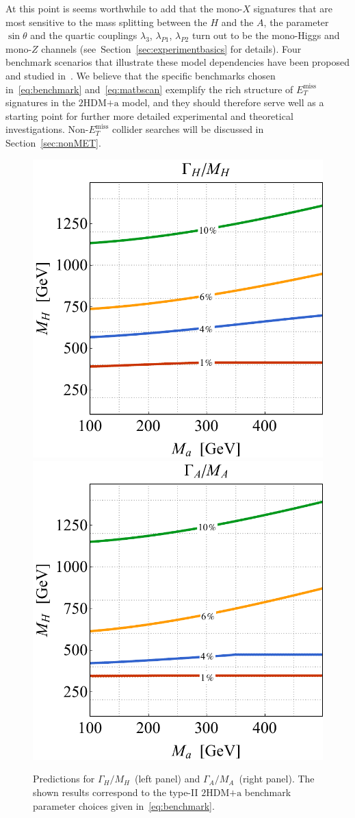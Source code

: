 \documentclass[a4paper, 11pt,notoc]{article}
\newcommand{\MET}{\ensuremath{E_T^\mathrm{miss}}\xspace}
\newcommand{\hdma}{\ensuremath{\textrm{2HDM+a}}\xspace}
\begin{document}
At this point is seems worthwhile to add that the mono-$X$ signatures that are most sensitive to the mass splitting between the $H$ and the $A$, the parameter $\sin \theta$ and the quartic couplings $\lambda_{3}$, $\lambda_{P1}$, $\lambda_{P2}$ turn out to be  the mono-Higgs and mono-$Z$ channels (see~Section~\ref{sec:experimentbasics} for details). Four benchmark scenarios that illustrate these model dependencies have been proposed and studied in~\cite{Bauer:2017ota}.  We believe that the specific benchmarks  chosen in~\eqref{eq:benchmark} and~\eqref{eq:matbscan}   exemplify  the rich structure of $\MET$ signatures in the \hdma model, and they should therefore serve well as a starting point for further more detailed experimental and theoretical investigations. Non-$\MET$ collider searches will be discussed in Section~\ref{sec:nonMET}. 

\begin{figure}[t!]
\centering
\includegraphics[height=.45\textwidth]{figure5l.pdf} \qquad 
\includegraphics[height=.45\textwidth]{figure5r.pdf}
\vspace{4mm}
\caption{\label{fig:Gammas}  Predictions for  $\Gamma_H/M_H$~(left panel) and $\Gamma_A/M_A$~(right panel). The shown results correspond to the type-II \hdma benchmark parameter choices given in~\eqref{eq:benchmark}.}
\end{figure}
\end{document}
